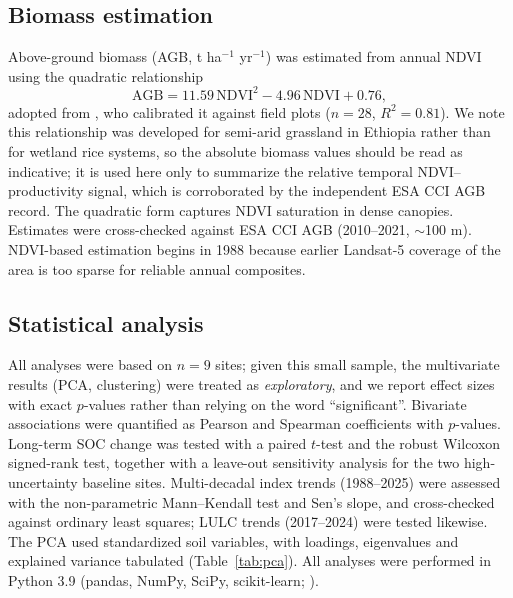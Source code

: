 \documentclass[preprint,authoryear,12pt]{elsarticle}
\begin{document}
\subsection{Biomass estimation}
\label{subsec:biomass}
Above-ground biomass (AGB, t ha$^{-1}$ yr$^{-1}$) was estimated from annual NDVI using the
quadratic relationship
\begin{equation}
\mathrm{AGB} = 11.59\,\mathrm{NDVI}^2 - 4.96\,\mathrm{NDVI} + 0.76,
\label{eq:biomass}
\end{equation}
adopted from \citet{Meshesha2020}, who calibrated it against field plots ($n=28$, $R^2=0.81$).
We note this relationship was developed for semi-arid grassland in Ethiopia rather than for
wetland rice systems, so the absolute biomass values should be read as indicative; it is used
here only to summarize the relative temporal NDVI--productivity signal, which is corroborated
by the independent ESA CCI AGB record. The quadratic form captures NDVI saturation in dense
canopies. Estimates were cross-checked against ESA CCI AGB (2010--2021, $\sim$100 m). NDVI-based estimation begins in 1988 because earlier Landsat-5
coverage of the area is too sparse for reliable annual composites.

\subsection{Statistical analysis}
\label{subsec:stats}
All analyses were based on $n=9$ sites; given this small sample, the multivariate results (PCA,
clustering) were treated as \emph{exploratory}, and we report effect sizes
with exact $p$-values rather than relying on the word ``significant''. Bivariate associations
were quantified as Pearson and Spearman coefficients with $p$-values. Long-term SOC change was
tested with a paired $t$-test and the robust Wilcoxon signed-rank test, together with a
leave-out sensitivity analysis for the two high-uncertainty baseline sites. Multi-decadal index
trends (1988--2025) were assessed with the non-parametric Mann--Kendall test and Sen's slope,
and cross-checked against ordinary least squares; LULC trends (2017--2024) were tested likewise.
The PCA used standardized soil variables, with loadings, eigenvalues and explained variance
tabulated (Table~\ref{tab:pca}). All analyses were performed in Python 3.9 (pandas, NumPy,
SciPy, scikit-learn; \citealp{Pedregosa2011}).
\end{document}
